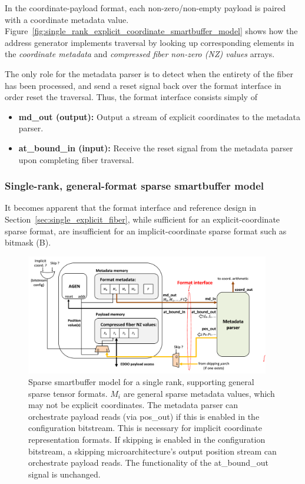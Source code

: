 In the coordinate-payload format, each non-zero/non-empty payload is paired with a coordinate metadata value. Figure~\ref{fig:single_rank_explicit_coordinate_smartbuffer_model} shows how the address generator implements traversal by looking up corresponding elements in the \textit{coordinate metadata} and \textit{compressed fiber non-zero (NZ) values} arrays. 

The only role for the metadata parser is to detect when the entirety of the fiber has been processed, and send a reset signal back over the format interface in order reset the traversal. Thus, the format interface consists simply of

\begin{itemize}
    \item \textbf{md\_out (output):} Output a stream of explicit coordinates to the metadata parser.
    \item \textbf{at\_bound\_in (input):} Receive the reset signal from the metadata parser upon completing fiber traversal.
\end{itemize}

\subsubsection{Single-rank, general-format sparse smartbuffer model}

It becomes apparent that the format interface and reference design in Section~\ref{sec:single_explicit_fiber}, while sufficient for an explicit-coordinate sparse format, are insufficient for an implicit-coordinate sparse format such as bitmask (B)\cite{szebook}.

\begin{figure}[ht]
    \centering
    \includegraphics[width=0.95\textwidth]{figures/single_rank_general_format_smartbuffer_model.png}
    \caption{Sparse smartbuffer model for a single rank, supporting general sparse tensor formats. ${M_i}$ are general sparse metadata values, which may not be explicit coordinates. The metadata parser can orchestrate payload reads (via pos\_out) if this is enabled in the configuration bitstream. This is necessary for implicit coordinate representation formats. If skipping is enabled in the configuration bitstream, a skipping microarchitecture's output position stream can orchestrate payload reads. The functionality of the at\_bound\_out signal is unchanged. }
    \label{fig:single_rank_general_format_smartbuffer_model}
\end{figure}

